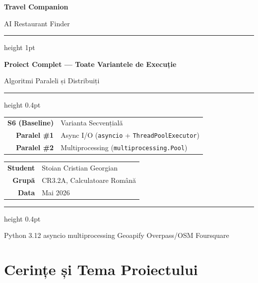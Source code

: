 \documentclass[12pt,a4paper]{article}
\begin{document}
\begin{titlepage}
  \centering
  \vspace*{1.5cm}
  {\Huge\bfseries\color{primary}Travel Companion\par}
  \vspace{0.4cm}
  {\Large\color{darkgray}AI Restaurant Finder\par}
  \vspace{0.8cm}
  \hrule height 1pt
  \vspace{0.6cm}
  {\large\bfseries\color{accent}Proiect Complet --- Toate Variantele de Execuție\par}
  \vspace{0.3cm}
  {\normalsize\color{darkgray}Algoritmi Paraleli și Distribuiți\par}
  \vspace{0.6cm}
  \hrule height 0.4pt
  \vspace{1.2cm}

  \begin{tabular}{rl}
    \textbf{S6 (Baseline)} & Varianta Secvențială \\[4pt]
    \textbf{Paralel \#1}   & Async I/O (\texttt{asyncio} + \texttt{ThreadPoolExecutor}) \\[4pt]
    \textbf{Paralel \#2}   & Multiprocessing (\texttt{multiprocessing.Pool}) \\
  \end{tabular}

  \vspace{1.5cm}
  \begin{tabular}{rl}
    \textbf{Student}  & Stoian Cristian Georgian \\
    \textbf{Grupă}    & CR3.2A, Calculatoare Română \\
    \textbf{Data}     & Mai 2026 \\
  \end{tabular}

  \vfill
  \hrule height 0.4pt
  \vspace{0.4cm}
  {\small\color{darkgray}Python 3.12 \textbar{} asyncio \textbar{} multiprocessing \textbar{} Geoapify \textbar{} Overpass/OSM \textbar{} Foursquare\par}
\end{titlepage}

\tableofcontents
\newpage

\section{Cerințe și Tema Proiectului}
\end{document}
